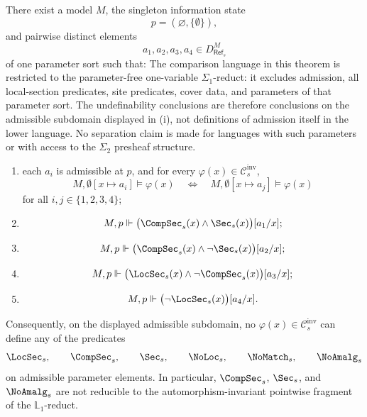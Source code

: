 \begin{theorem}\label{thm:pointwise-irreducibility}
There exist a model $M$, the singleton information state
\[
p=(\varnothing,\{\emptyset\}),
\]
and pairwise distinct elements
\[
a_1,a_2,a_3,a_4\in D_{\mathsf{Ref}_s}^M
\]
of one parameter sort such that:
The comparison language in this theorem is restricted to the
parameter-free one-variable \(\Sigma_1\)-reduct: it excludes admission,
all local-section predicates, site predicates, cover data, and parameters of
that parameter sort. The undefinability conclusions are therefore conclusions on
the admissible subdomain displayed in \textup{(i)}, not definitions of
admission itself in the lower language.
No separation claim is made for languages with such parameters or with
access to the \(\Sigma_2\) presheaf structure.
\begin{enumerate}[label=(\roman*),nosep]
\item each $a_i$ is admissible at $p$, and for every $\varphi(x)\in\mathcal{C}_{s}^{\mathrm{inv}}$,
\[
M,\emptyset[x\mapsto a_i]\models\varphi(x)
\quad\Longleftrightarrow\quad
M,\emptyset[x\mapsto a_j]\models\varphi(x)
\]
for all $i,j\in\{1,2,3,4\}$;
\item
\[
M,p\Vdash \bigl(\CompSec_s(x)\land \Sec_s(x)\bigr)[a_1/x];
\]
\item
\[
M,p\Vdash \bigl(\CompSec_s(x)\land \neg\Sec_s(x)\bigr)[a_2/x];
\]
\item
\[
M,p\Vdash \bigl(\LocSec_s(x)\land \neg\CompSec_s(x)\bigr)[a_3/x];
\]
\item
\[
M,p\Vdash \bigl(\neg\LocSec_s(x)\bigr)[a_4/x].
\]
\end{enumerate}
Consequently, on the displayed admissible subdomain, no $\varphi(x)\in\mathcal{C}_{s}^{\mathrm{inv}}$ can define any of the predicates
\[
\LocSec_s,
\qquad
\CompSec_s,
\qquad
\Sec_s,
\qquad
\NoLoc_s,
\qquad
\NoMatch_s,
\qquad
\NoAmalg_s
\]
on admissible parameter elements. In particular, $\CompSec_s$, $\Sec_s$, and $\NoAmalg_s$ are not reducible to the automorphism-invariant pointwise fragment of the $\mathbb L_1$-reduct.
\end{theorem}

